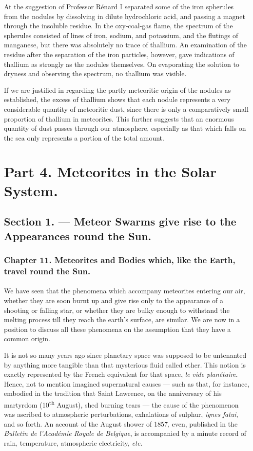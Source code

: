 \documentclass[a4paper, 12pt, oneside, polutonikogreek, english]{article}
\begin{document}
At the suggestion of Professor Rénard I separated some of the iron spherules from the nodules by dissolving in dilute hydrochloric acid, and passing a magnet through the insoluble residue. In the oxy-coal-gas flame, the spectrum of the spherules consisted of lines of iron, sodium, and potassium, and the flutings of manganese, but there was absolutely no trace of thallium. An examination of the residue after the separation of the iron particles, however, gave indications of thallium as strongly as the nodules themselves. On evaporating the solution to dryness and observing the spectrum, no thallium was visible.

If we are justified in regarding the partly meteoritic origin of the nodules as established, the excess of thallium shows that each nodule represents a very considerable quantity of meteoritic dust, since there is only a comparatively small proportion of thallium in meteorites. This further suggests that an enormous quantity of dust passes through our atmosphere, especially as that which falls on the sea only represents a portion of the total amount.
\clearpage
\section{Part 4. Meteorites in the Solar System.}
\subsection{Section 1. --- Meteor Swarms give rise to the Appearances round the Sun.}
\subsubsection{Chapter 11. Meteorites and Bodies which, like the Earth, travel round the Sun.}
\paragraph{}
We have seen that the phenomena which accompany meteorites entering our air, whether they are soon burnt up and give rise only to the appearance of a shooting or falling star, or whether they are bulky enough to withstand the melting process till they reach the earth's surface, are similar. We are now in a position to discuss all these phenomena on the assumption that they have a common origin.

It is not so many years ago since planetary space was supposed to be untenanted by anything more tangible than that mysterious fluid called ether. This notion is exactly represented by the French equivalent for that space, \emph{le vide planétaire}. Hence, not to mention imagined supernatural causes --- such as that, for instance, embodied in the tradition that Saint Lawrence, on the anniversary of his martyrdom (10\textsuperscript{th} August), shed burning tears --- the cause of the phenomenon was ascribed to atmospheric perturbations, exhalations of sulphur, \emph{ignes fatui}, and so forth. An account of the August shower of 1857, even, published in the \emph{Bulletin de l'Académie Royale de Belgique}, is accompanied by a minute record of rain, temperature, atmospheric electricity, \emph{etc.}
\end{document}
